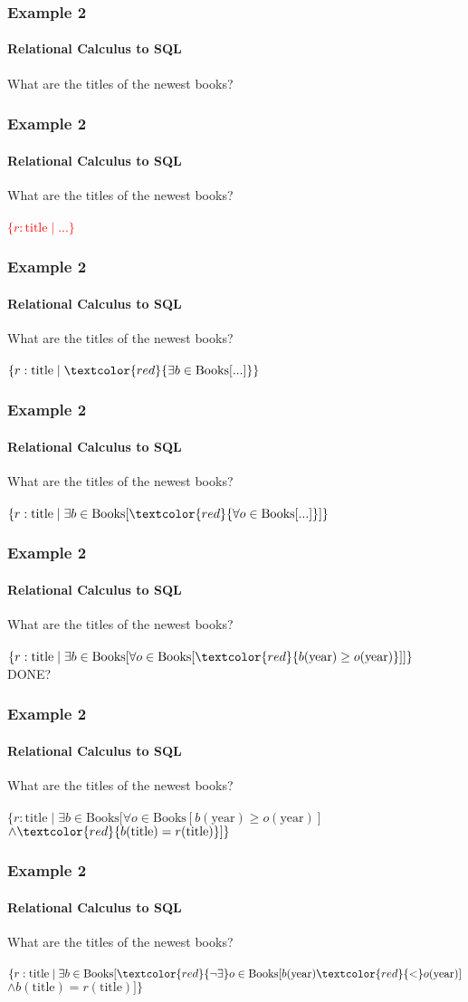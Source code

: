 \documentclass{beamer}
\begin{document}
\begin{frame}
  \frametitle{Example 2}
    \framesubtitle{Relational Calculus to SQL}
  What are the titles of the newest books?\\
\end{frame}

\begin{frame}
  \frametitle{Example 2}
    \framesubtitle{Relational Calculus to SQL}
  What are the titles of the newest books?\\
  \hfill \\
  \textcolor{red}{$\{r:\text{title} \mid ... \}$}
\end{frame}
\begin{frame}
  \frametitle{Example 2}
    \framesubtitle{Relational Calculus to SQL}
  What are the titles of the newest books?\\
  \hfill \\
  $\{r:\text{title} \mid \textcolor{red}{\exists b \in \text{Books} [...]} \}$
\end{frame}
\begin{frame}
  \frametitle{Example 2}
    \framesubtitle{Relational Calculus to SQL}
  What are the titles of the newest books?\\
  \hfill \\
  $\{r:\text{title} \mid \exists b \in \text{Books} [ \textcolor{red}{\forall o \in \text{Books} [...]} ] \}$
\end{frame}
\begin{frame}
  \frametitle{Example 2}
    \framesubtitle{Relational Calculus to SQL}
  What are the titles of the newest books?\\
  \hfill \\
  $\{r:\text{title} \mid \exists b \in \text{Books} [ \forall o \in \text{Books} [ \textcolor{red}{b(\text{year}) \geq o(\text{year})}]] \}$\\
  DONE?
\end{frame}
\begin{frame}
  \frametitle{Example 2}
    \framesubtitle{Relational Calculus to SQL}
  What are the titles of the newest books?\\
  \hfill \\
  $\{r:\text{title} \mid \exists b \in \text{Books} [ \forall o \in \text{Books} [ b(\text{year}) \geq o(\text{year})]$\\
  $\land \textcolor{red}{b(\text{title}) = r(\text{title})}] \}$
\end{frame}
\begin{frame}
  \frametitle{Example 2}
    \framesubtitle{Relational Calculus to SQL}
  What are the titles of the newest books?\\
  \hfill \\
  $\{r:\text{title} \mid \exists b \in \text{Books} [ \textcolor{red}{\neg\exists} o \in \text{Books} [ b(\text{year}) \textcolor{red}{<} o(\text{year})]$\\
  $\land b(\text{title}) = r(\text{title})] \}$
\end{frame}
\end{document}
